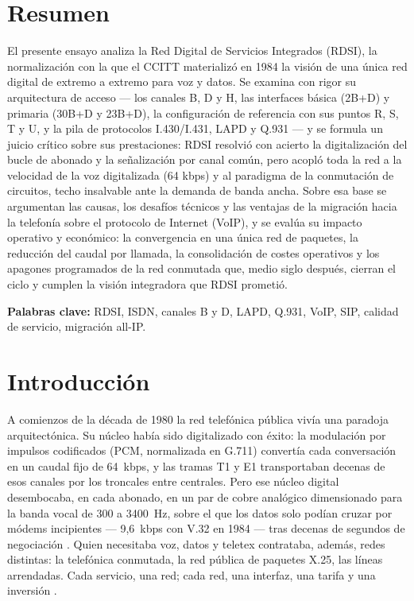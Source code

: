 \documentclass[12pt,a4paper]{article}
\begin{document}
\section{Resumen}

El presente ensayo analiza la Red Digital de Servicios Integrados (RDSI), la normalización con la que el CCITT materializó en 1984 la visión de una única red digital de extremo a extremo para voz y datos. Se examina con rigor su arquitectura de acceso --- los canales B, D y H, las interfaces básica (2B+D) y primaria (30B+D y 23B+D), la configuración de referencia con sus puntos R, S, T y U, y la pila de protocolos I.430/I.431, LAPD y Q.931 --- y se formula un juicio crítico sobre sus prestaciones: RDSI resolvió con acierto la digitalización del bucle de abonado y la señalización por canal común, pero acopló toda la red a la velocidad de la voz digitalizada (64 kbps) y al paradigma de la conmutación de circuitos, techo insalvable ante la demanda de banda ancha. Sobre esa base se argumentan las causas, los desafíos técnicos y las ventajas de la migración hacia la telefonía sobre el protocolo de Internet (VoIP), y se evalúa su impacto operativo y económico: la convergencia en una única red de paquetes, la reducción del caudal por llamada, la consolidación de costes operativos y los apagones programados de la red conmutada que, medio siglo después, cierran el ciclo y cumplen la visión integradora que RDSI prometió.

\noindent\textbf{Palabras clave:} RDSI, ISDN, canales B y D, LAPD, Q.931, VoIP, SIP, calidad de servicio, migración all-IP.

\section{Introducción}

A comienzos de la década de 1980 la red telefónica pública vivía una paradoja arquitectónica. Su núcleo había sido digitalizado con éxito: la modulación por impulsos codificados (PCM, normalizada en G.711) convertía cada conversación en un caudal fijo de 64~kbps, y las tramas T1 y E1 transportaban decenas de esos canales por los troncales entre centrales. Pero ese núcleo digital desembocaba, en cada abonado, en un par de cobre analógico dimensionado para la banda vocal de 300 a 3400~Hz, sobre el que los datos solo podían cruzar por módems incipientes --- 9,6~kbps con V.32 en 1984 --- tras decenas de segundos de negociación \cite{schwartz1987, tanenbaum2012}. Quien necesitaba voz, datos y teletex contrataba, además, redes distintas: la telefónica conmutada, la red pública de paquetes X.25, las líneas arrendadas. Cada servicio, una red; cada red, una interfaz, una tarifa y una inversión \cite{stallings1999}.
\end{document}
